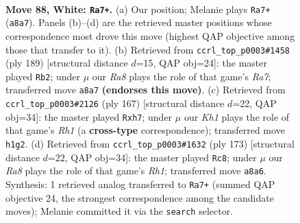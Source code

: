 \documentclass[11pt]{article}
\begin{document}
\clearpage

\begin{figure}[p]\centering
\begin{subfigure}{0.46\textwidth}\centering
\resizebox{\linewidth}{!}{%
\newchessgame
\chessboard[
  setfen={R7/4k3/8/7n/p6r/P7/7p/7K w - - 2 88},
  showmover=false,
  pgfstyle=straightmove, color=movearrow, markmove={a8-a7}
]}
\caption{}
\end{subfigure}\hfill
\begin{subfigure}{0.46\textwidth}\centering
\resizebox{\linewidth}{!}{%
\newchessgame
\chessboard[
  setfen={8/8/4K3/pPk5/P5R1/8/r7/8 b - - 88 95},
  showmover=false,
  pgfstyle=straightmove, color=movearrow, markmove={a2-b2}
]}
\caption{}
\end{subfigure}
\\[4pt]
\begin{subfigure}{0.46\textwidth}\centering
\resizebox{\linewidth}{!}{%
\newchessgame
\chessboard[
  setfen={7r/1R5P/6k1/6p1/6P1/8/6K1/8 b - - 2 84},
  showmover=false,
  pgfstyle=straightmove, color=movearrow, markmove={h8-h7}
]}
\caption{}
\end{subfigure}\hfill
\begin{subfigure}{0.46\textwidth}\centering
\resizebox{\linewidth}{!}{%
\newchessgame
\chessboard[
  setfen={7r/8/8/6K1/Pk6/1P4R1/8/8 b - - 82 87},
  showmover=false,
  pgfstyle=straightmove, color=movearrow, markmove={h8-c8}
]}
\caption{}
\end{subfigure}
\caption{\textbf{Move 88, White: \texttt{Ra7+}.} (a) Our position; Melanie plays \texttt{Ra7+} (\texttt{a8a7}). Panels (b)--(d) are the retrieved master positions whose correspondence most drove this move (highest QAP objective among those that transfer to it). (b) Retrieved from \texttt{ccrl\_top\_p0003\#1458} (ply 189) [structural distance $d$=15, QAP obj=24]: the master played \texttt{Rb2}; under $\mu$ our \emph{Ra8} plays the role of that game's \emph{Ra7}; transferred move \texttt{a8a7} \textbf{(endorses this move)}. (c) Retrieved from \texttt{ccrl\_top\_p0003\#2126} (ply 167) [structural distance $d$=22, QAP obj=34]: the master played \texttt{Rxh7}; under $\mu$ our \emph{Kh1} plays the role of that game's \emph{Rh1} (a \textbf{cross-type} correspondence); transferred move \texttt{h1g2}. (d) Retrieved from \texttt{ccrl\_top\_p0003\#1632} (ply 173) [structural distance $d$=22, QAP obj=34]: the master played \texttt{Rc8}; under $\mu$ our \emph{Ra8} plays the role of that game's \emph{Rh1}; transferred move \texttt{a8a6}. Synthesis: 1 retrieved analog transferred to \texttt{Ra7+} (summed QAP objective 24, the strongest correspondence among the candidate moves); Melanie committed it via the \texttt{search} selector.}
\label{fig:thought-m174}
\end{figure}
\end{document}
